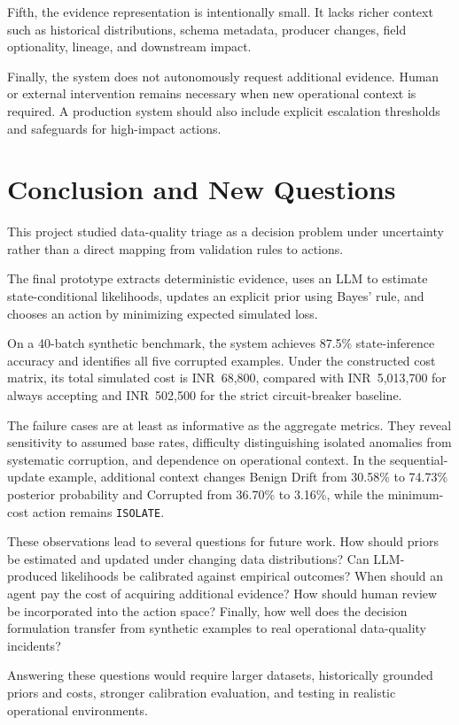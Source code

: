 \documentclass{article}
\begin{document}
Fifth, the evidence representation is intentionally small. It lacks richer context such as historical distributions, schema metadata, producer changes, field optionality, lineage, and downstream impact.

Finally, the system does not autonomously request additional evidence. Human or external intervention remains necessary when new operational context is required. A production system should also include explicit escalation thresholds and safeguards for high-impact actions.


\section{Conclusion and New Questions}

This project studied data-quality triage as a decision problem under uncertainty rather than a direct mapping from validation rules to actions.

The final prototype extracts deterministic evidence, uses an LLM to estimate state-conditional likelihoods, updates an explicit prior using Bayes' rule, and chooses an action by minimizing expected simulated loss.

On a 40-batch synthetic benchmark, the system achieves 87.5\% state-inference accuracy and identifies all five corrupted examples. Under the constructed cost matrix, its total simulated cost is INR~68,800, compared with INR~5,013,700 for always accepting and INR~502,500 for the strict circuit-breaker baseline.

The failure cases are at least as informative as the aggregate metrics. They reveal sensitivity to assumed base rates, difficulty distinguishing isolated anomalies from systematic corruption, and dependence on operational context. In the sequential-update example, additional context changes Benign Drift from 30.58\% to 74.73\% posterior probability and Corrupted from 36.70\% to 3.16\%, while the minimum-cost action remains \texttt{ISOLATE}.

These observations lead to several questions for future work. How should priors be estimated and updated under changing data distributions? Can LLM-produced likelihoods be calibrated against empirical outcomes? When should an agent pay the cost of acquiring additional evidence? How should human review be incorporated into the action space? Finally, how well does the decision formulation transfer from synthetic examples to real operational data-quality incidents?

Answering these questions would require larger datasets, historically grounded priors and costs, stronger calibration evaluation, and testing in realistic operational environments.
\end{document}
